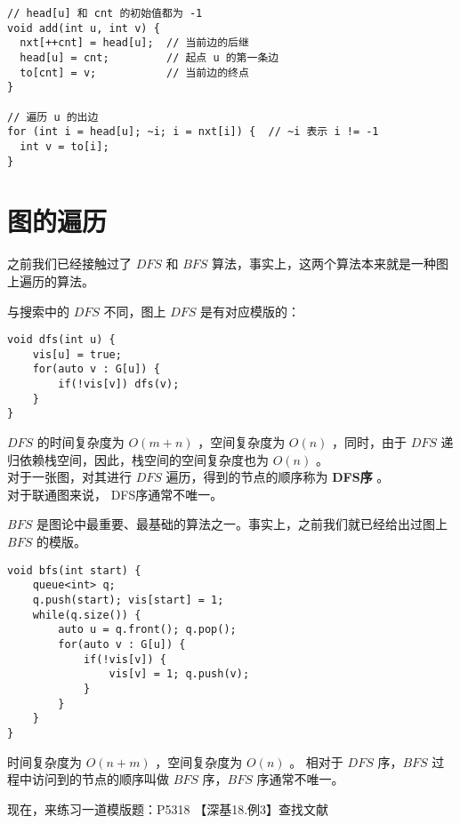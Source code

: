 \documentclass{beamer}
\newcommand{\fdf}[1]{\alert{\textbf{#1}}}
\begin{document}
\begin{frame}[fragile]
\begin{onlyenv}
\begin{verbatim}
// head[u] 和 cnt 的初始值都为 -1
void add(int u, int v) {
  nxt[++cnt] = head[u];  // 当前边的后继
  head[u] = cnt;         // 起点 u 的第一条边
  to[cnt] = v;           // 当前边的终点
}

// 遍历 u 的出边
for (int i = head[u]; ~i; i = nxt[i]) {  // ~i 表示 i != -1
  int v = to[i];
}
\end{verbatim}
\end{onlyenv}
\end{frame}
\section{图的遍历}
\begin{frame}
之前我们已经接触过了 $DFS$ 和 $BFS$ 算法，事实上，这两个算法本来就是一种图上遍历的算法。
\end{frame}
\begin{frame}[fragile]
与搜索中的 $DFS$ 不同，图上 $DFS$ 是有对应模版的：
\begin{onlyenv}
\begin{verbatim}
void dfs(int u) {
    vis[u] = true;
    for(auto v : G[u]) {
        if(!vis[v]) dfs(v);
    }
}
\end{verbatim}
\end{onlyenv}
$DFS$ 的时间复杂度为 $O(m + n)$ ，空间复杂度为 $O(n)$ ，同时，由于 $DFS$ 递归依赖栈空间，因此，栈空间的空间复杂度也为 $O(n)$ 。 \\
对于一张图，对其进行 $DFS$ 遍历，得到的节点的顺序称为 \fdf{DFS序} 。 \\ 
对于联通图来说， DFS序通常不唯一。 
\end{frame}
\begin{frame}[fragile]
$BFS$ 是图论中最重要、最基础的算法之一。事实上，之前我们就已经给出过图上 $BFS$ 的模版。
\begin{onlyenv}
\begin{verbatim}
void bfs(int start) {
    queue<int> q;
    q.push(start); vis[start] = 1;
    while(q.size()) {
        auto u = q.front(); q.pop();
        for(auto v : G[u]) {
            if(!vis[v]) {
                vis[v] = 1; q.push(v);
            }
        }
    }
}
\end{verbatim}
\end{onlyenv}
时间复杂度为 $O(n + m)$ ，空间复杂度为 $O(n)$ 。
相对于 $DFS$ 序，$BFS$ 过程中访问到的节点的顺序叫做 $BFS$ 序，$BFS$ 序通常不唯一。
\end{frame}
\begin{frame}
现在，来练习一道模版题：P5318 【深基18.例3】查找文献
\end{frame}
\end{document}
